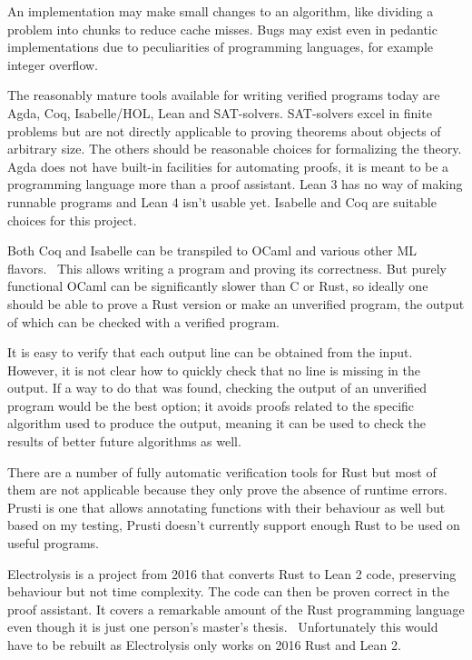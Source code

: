 \documentclass{article}
\begin{document}
An implementation may make small changes to an algorithm, like dividing a problem into chunks to reduce cache misses. Bugs may exist even in pedantic implementations due to peculiarities of programming languages, for example integer overflow.

The reasonably mature tools available for writing verified programs today are Agda, Coq, Isabelle/HOL, Lean and SAT-solvers. SAT-solvers excel in finite problems but are not directly applicable to proving theorems about objects of arbitrary size. The others should be reasonable choices for formalizing the theory. Agda does not have built-in facilities for automating proofs, it is meant to be a programming language more than a proof assistant. Lean 3 has no way of making runnable programs and Lean 4 isn't usable yet. Isabelle and Coq are suitable choices for this project.

Both Coq and Isabelle can be transpiled to OCaml and various other ML flavors.\ \cite{CoqCodegen, IsabelleCodegen} This allows writing a program and proving its correctness. But purely functional OCaml can be significantly slower than C or Rust, so ideally one should be able to prove a Rust version or make an unverified program, the output of which can be checked with a verified program.

It is easy to verify that each output line can be obtained from the input. However, it is not clear how to quickly check that no line is missing in the output. If a way to do that was found, checking the output of an unverified program would be the best option; it avoids proofs related to the specific algorithm used to produce the output, meaning it can be used to check the results of better future algorithms as well.

There are a number of fully automatic verification tools for Rust but most of them are not applicable because they only prove the absence of runtime errors. Prusti is one that allows annotating functions with their behaviour as well but based on my testing, Prusti doesn't currently support enough Rust to be used on useful programs.

Electrolysis is a project from 2016 that converts Rust to Lean 2 code, preserving behaviour but not time complexity. The code can then be proven correct in the proof assistant. It covers a remarkable amount of the Rust programming language even though it is just one person's master's thesis.\ \cite{ElectrolysisCoverage} Unfortunately this would have to be rebuilt as Electrolysis only works on 2016 Rust and Lean 2.
\end{document}
